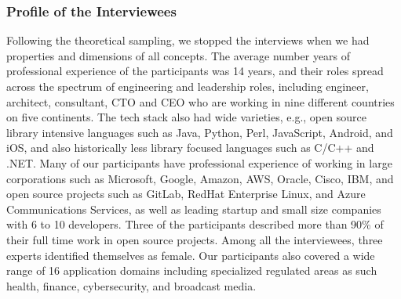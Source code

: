 
\subsubsection{Profile of the Interviewees}
Following the theoretical sampling, we stopped the interviews when we had properties and dimensions of all concepts. The average number years of professional experience of the participants was 14 years, and their roles spread across the spectrum of engineering and leadership roles, including engineer, architect, consultant, CTO and CEO who are working in nine different countries on five continents. The tech stack also had wide varieties, e.g., open source library intensive languages such as Java, Python, Perl, JavaScript, Android, and iOS, and also historically less library focused languages such as C/C++ and .NET. Many of our participants have professional experience of working in large corporations such as Microsoft, Google, Amazon, AWS, Oracle, Cisco, IBM, and open source projects such as GitLab, RedHat Enterprise Linux, and Azure Communications Services, as well as leading startup and small size companies with 6 to 10 developers. Three of the participants described more than 90\% of their full time work in open source projects. Among all the interviewees, three experts identified themselves as female. Our participants also covered a wide range of 16 application domains including specialized regulated areas as such health, finance, cybersecurity, and broadcast media. 

